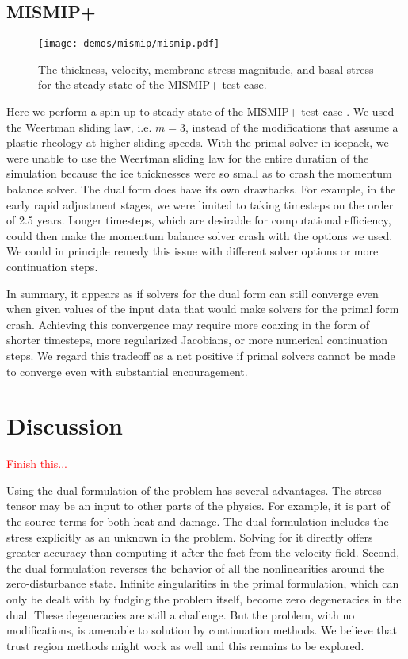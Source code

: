\documentclass{article}
\theoremstyle{definition}
\theoremstyle{plain}
\begin{document}
\subsection{MISMIP+} \label{sec:mismip}

\begin{figure}[t]
    \begin{center}
        \texttt{[image: demos/mismip/mismip.pdf]}
    \end{center}
    \caption{The thickness, velocity, membrane stress magnitude, and basal stress for the steady state of the MISMIP+ test case.}
    \label{fig:mismip}
\end{figure}

Here we perform a spin-up to steady state of the MISMIP+ test case \citep{asay2016experimental}.
We used the Weertman sliding law, i.e. $m = 3$, instead of the modifications that assume a plastic rheology at higher sliding speeds.
With the primal solver in icepack, we were unable to use the Weertman sliding law for the entire duration of the simulation because the ice thicknesses were so small as to crash the momentum balance solver.
The dual form does have its own drawbacks.
For example, in the early rapid adjustment stages, we were limited to taking timesteps on the order of 2.5 years.
Longer timesteps, which are desirable for computational efficiency, could then make the momentum balance solver crash with the options we used.
We could in principle remedy this issue with different solver options or more continuation steps.

In summary, it appears as if solvers for the dual form can still converge even when given values of the input data that would make solvers for the primal form crash.
Achieving this convergence may require more coaxing in the form of shorter timesteps, more regularized Jacobians, or more numerical continuation steps.
We regard this tradeoff as a net positive if primal solvers cannot be made to converge even with substantial encouragement.


\section{Discussion}

\textcolor{red}{Finish this...}

Using the dual formulation of the problem has several advantages.
The stress tensor may be an input to other parts of the physics.
For example, it is part of the source terms for both heat and damage.
The dual formulation includes the stress explicitly as an unknown in the problem.
Solving for it directly offers greater accuracy than computing it after the fact from the velocity field.
Second, the dual formulation reverses the behavior of all the nonlinearities around the zero-disturbance state.
Infinite singularities in the primal formulation, which can only be dealt with by fudging the problem itself, become zero degeneracies in the dual.
These degeneracies are still a challenge.
But the problem, with no modifications, is amenable to solution by continuation methods.
We believe that trust region methods might work as well and this remains to be explored.
\end{document}
